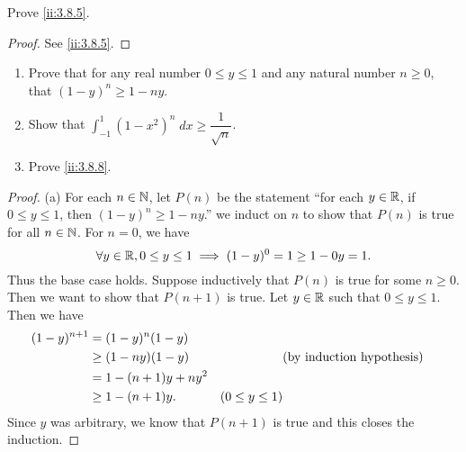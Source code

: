 \exercisesection

\begin{ex}\label{ii:ex:3.8.1}
  Prove \cref{ii:3.8.5}.
\end{ex}

\begin{proof}
  See \cref{ii:3.8.5}.
\end{proof}

\begin{ex}\label{ii:ex:3.8.2}
  \quad
  \begin{enumerate}
    \item Prove that for any real number \(0 \leq y \leq 1\) and any natural number \(n \geq 0\), that \((1 - y)^n \geq 1 - ny\).
    \item Show that \(\int_{-1}^1 (1 - x^2)^n \; dx \geq \dfrac{1}{\sqrt{n}}\).
    \item Prove \cref{ii:3.8.8}.
  \end{enumerate}
\end{ex}

\begin{proof}{(a)}
  For each \(n \in \mathbb{N}\), let \(P(n)\) be the statement ``for each \(y \in \mathbb{R}\), if \(0 \leq y \leq 1\), then \((1 - y)^n \geq 1 - ny\).''
  we induct on \(n\) to show that \(P(n)\) is true for all \(n \in \mathbb{N}\).
  For \(n = 0\), we have
  \[
    \forall y \in \mathbb{R}, 0 \leq y \leq 1 \implies (1 - y)^0 = 1 \geq 1 - 0y = 1.
  \]
  Thus the base case holds.
  Suppose inductively that \(P(n)\) is true for some \(n \geq 0\).
  Then we want to show that \(P(n + 1)\) is true.
  Let \(y \in \mathbb{R}\) such that \(0 \leq y \leq 1\).
  Then we have
  \begin{align*}
    (1 - y)^{n + 1} & = (1 - y)^n (1 - y)                                \\
                    & \geq (1 - ny) (1 - y)  &                   & \text{(by induction hypothesis)} \\
                    & = 1 - (n + 1)y + n y^2                             \\
                    & \geq 1 - (n + 1)y.     & (0 \leq y \leq 1)
  \end{align*}
  Since \(y\) was arbitrary, we know that \(P(n + 1)\) is true and this closes the induction.
\end{proof}

